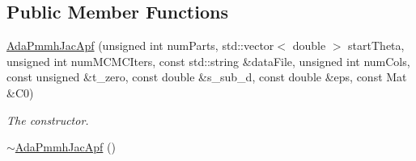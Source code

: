 \subsection*{Public Member Functions}
\begin{DoxyCompactItemize}
\item 
\hyperlink{classAdaPmmhJacApf_afcf19c44b6cdd3562e692f6532b7227b}{Ada\+Pmmh\+Jac\+Apf} (unsigned int num\+Parts, std\+::vector$<$ double $>$ start\+Theta, unsigned int num\+M\+C\+M\+C\+Iters, const std\+::string \&data\+File, unsigned int num\+Cols, const unsigned \&t\+\_\+zero, const double \&s\+\_\+sub\+\_\+d, const double \&eps, const Mat \&C0)
\begin{DoxyCompactList}\small\item\em The constructor. \end{DoxyCompactList}\item 
\hyperlink{classAdaPmmhJacApf_a3afcf0cc8944fa1bf46300be89fc2737}{$\sim$\+Ada\+Pmmh\+Jac\+Apf} ()\hypertarget{classAdaPmmhJacApf_a3afcf0cc8944fa1bf46300be89fc2737}{}\label{classAdaPmmhJacApf_a3afcf0cc8944fa1bf46300be89fc2737}


\end{DoxyCompactItemize}
